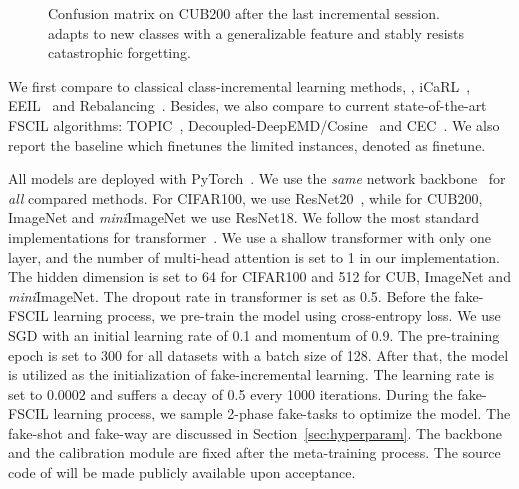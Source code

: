 \begin{figure*}[h]
	\begin{center}
	\end{center}
	
	\caption{  Confusion matrix on CUB200 after the last incremental session.  	{\name adapts to new classes with a generalizable feature and stably resists catastrophic forgetting. }
	} \label{figure:confmat}
	
\end{figure*}



 We first compare to classical class-incremental learning methods, \eg, iCaRL~\cite{rebuffi2017icarl}, EEIL~\cite{castro2018end} and Rebalancing~\cite{hou2019learning}. Besides, we also compare to current state-of-the-art FSCIL algorithms: TOPIC~\cite{tao2020few}, 
 Decoupled-DeepEMD/Cosine~\cite{zhang2020deepemd,vinyals2016matching} and CEC~\cite{zhang2021few}. We also report the baseline  which finetunes the limited instances, denoted as finetune.





All models are deployed with PyTorch~\cite{paszke2019pytorch}.
 We use the \emph{same} network backbone~\cite{tao2020few} for \emph{all} compared methods. For CIFAR100, we use ResNet20~\cite{he2015residual}, while for CUB200, ImageNet and {\it mini}ImageNet we use ResNet18. We follow the most standard implementations for transformer~\cite{vaswani2017attention}. We use a shallow transformer with only one layer, and the number of multi-head attention is set to 1 in our implementation.  The hidden dimension is set to 64 for CIFAR100 and 512 for CUB, ImageNet and \textit{mini}ImageNet. The dropout rate in transformer is set as 0.5.
 Before the fake-FSCIL learning process, we pre-train the model using cross-entropy loss. We use SGD with an initial learning rate of 0.1 and momentum of 0.9. The pre-training epoch is set to 300 for all datasets with a batch size of 128. After that, the model is utilized as the initialization of fake-incremental learning. The learning rate is set to $0.0002$ and suffers a decay of 0.5 every 1000 iterations.
 During the fake-FSCIL learning process, we sample 2-phase fake-tasks to optimize the model. 
 The fake-shot and fake-way are discussed in Section~\ref{sec:hyperparam}. The backbone and the calibration module are fixed after the meta-training process.
  The source code of \name will be made publicly available upon acceptance. 
  
